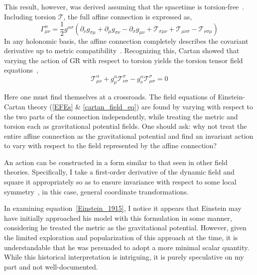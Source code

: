 \documentclass[aps,prd,preprint]{revtex4-1}
\begin{document}
This result, however, was derived assuming that the spacetime is torsion-free~\cite{Einstein_1915,Einstein_1916,misner_2017,watanabe_2004}. Including torsion $\mathcal{T}$, the full affine connection is expressed as,
\begin{equation}\label{affine_connection}
    \Gamma^{\alpha}_{\mu\nu}=\frac{1}{2}g^{\alpha\sigma}(\partial_{\nu}g_{\sigma\mu}+\partial_{\mu}g_{\sigma\nu}-\partial_{\sigma}g_{\mu\nu} + \mathcal{T}_{\sigma\mu\nu}+\mathcal{T}_{\mu\nu\sigma}-\mathcal{T}_{\nu\sigma\mu})
\end{equation}
In any holonomic basis, the affine connection completely describes the covariant derivative up to metric compatibility~\cite{misner_2017}. Recognizing this, Cartan showed that varying the action of GR with respect to torsion yields the torsion tensor field equations~\cite{cartan_1922},
\begin{equation}\label{cartan_field_eq}
    \mathcal{T}^{\alpha}_{\mu\nu} + g^{\alpha}_{\mu}\mathcal{T}^{\sigma}_{\nu\sigma} - g^{\alpha}_{\nu}\mathcal{T}^{\sigma}_{\mu\sigma} = 0
\end{equation}

Here one must find themselves at a crossroads. The field equations of Einstein-Cartan theory (\ref{EFEs} \& \ref{cartan_field_eq}) are found by varying with respect to the two parts of the connection independently, while treating the metric and torsion each as gravitational potential fields. One should ask: why not treat the entire affine connection as the gravitational potential and find an invariant action to vary with respect to the field represented by the affine connection?

An action can be constructed in a form similar to that seen in other field theories. Specifically, I take a first-order derivative of the dynamic field and square it appropriately so as to ensure invariance with respect to some local symmetry~\cite{peskin_1995,weinberg_1995}, in this case, general coordinate transformations.

In examining equation~\eqref{Einstein_1915}, I notice it appears that Einstein may have initially approached his model with this formulation in some manner, considering he treated the metric as the gravitational potential. However, given the limited exploration and popularization of this approach at the time, it is understandable that he was persuaded to adopt a more minimal scalar quantity. While this historical interpretation is intriguing, it is purely speculative on my part and not well-documented.
\end{document}
